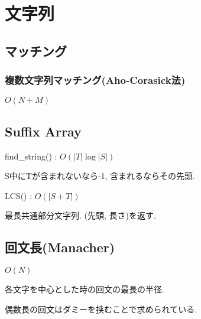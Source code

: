 
\section{文字列}
\subsection{マッチング}
\subsubsection{複数文字列マッチング(Aho-Corasick法)}
$O(N+M)$\par


\subsection{Suffix Array}
find\_string() : $O(|T|\log |S|)$\par
S中にTが含まれないなら-1, 含まれるならその先頭.\par
LCS() : $O(|S+T|)$\par
最長共通部分文字列. (先頭, 長さ)を返す.



\subsection{回文長(Manacher)}
$O(N)$\par
各文字を中心とした時の回文の最長の半径.\par
偶数長の回文はダミーを挟むことで求められている.\par

